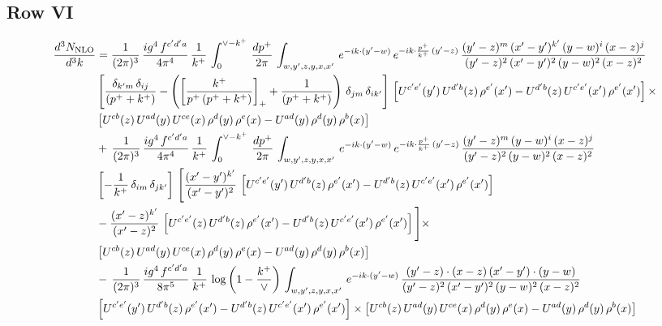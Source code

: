 \documentclass[9pt]{article}
\numberwithin{equation}{section}
\begin{document}
\subsection{Row VI}
\begin{align}
    \frac{d^{3}N_{\rm NLO}}{d^{3}k} & =  \frac{1}{(2\pi)^{3}}\, \frac{ig^{4}\,f^{c'd'a}}{4\pi^{4}}\, \frac{1}{k^{+}}\,\int_{0}^{\vee-k^{+}}\, \frac{dp^{+}}{2\pi}\, \int_{w,y',z,y,x,x'}\, e^{-ik\cdot (y'-w)}\, e^{-ik\cdot \frac{p^{+}}{k^{+}}\,(y'-z)}\,\frac{(y'-z)^{m}\,(x'-y')^{k'}\,(y-w)^{i}\,(x-z)^{j}}{(y'-z)^{2}\,(x'-y')^{2}\,(y-w)^{2}\,(x-z)^{2}}\notag \\ & \left[\frac{\delta_{k'm}\,\delta_{ij}}{(p^{+}+k^{+})}-\left(\left[\frac{k^{+}}{p^{+}\,(p^{+}+k^{+})}\right]_{+}+\frac{1}{(p^{+}+k^{+})}\right)\,\delta_{jm}\,\delta_{ik'}\right]\, \left[U^{c'e'}(y')\,U^{d'b}(z)\,\rho^{e'}(x')-U^{d'b}(z)\,U^{c'e'}(x')\,\rho^{e'}(x')\right]\times\notag \\ &  \left[U^{cb}(z)\,U^{ad}(y)\,U^{ce}(x)\,\rho^{d}(y)\,\rho^{e}(x)-U^{ad}(y)\,\rho^{d}(y)\,\rho^{b}(x)\right] \notag \\ &  +\,\frac{1}{(2\pi)^{3}}\, \frac{ig^{4}\,f^{c'd'a}}{4\pi^{4}}\, \frac{1}{k^{+}}\,\int_{0}^{\vee-k^{+}}\, \frac{dp^{+}}{2\pi}\, \int_{w,y',z,y,x,x'}\, e^{-ik\cdot (y'-w)}\, e^{-ik\cdot \frac{p^{+}}{k^{+}}\,(y'-z)}\,\frac{(y'-z)^{m}\,(y-w)^{i}\,(x-z)^{j}}{(y'-z)^{2}\,(y-w)^{2}\,(x-z)^{2}}\notag \\ &  \left[-\frac{1}{k^{+}}\, \delta_{im}\, \delta_{jk'}\right]\, \Bigg[\frac{(x'-y')^{k'}}{(x'-y')^{2}}\,\left[U^{c'e'}(y')\,U^{d'b}(z)\,\rho^{e'}(x')-U^{d'b}(z)\,U^{c'e'}(x')\,\rho^{e'}(x')\right]\notag \\ & -\frac{(x'-z)^{k'}}{(x'-z)^{2}}\,\left[U^{c'e'}(z)\,U^{d'b}(z)\,\rho^{e'}(x')-U^{d'b}(z)\,U^{c'e'}(x')\,\rho^{e'}(x')\right]\Bigg]\times\notag \\ &    \left[U^{cb}(z)\,U^{ad}(y)\,U^{ce}(x)\,\rho^{d}(y)\,\rho^{e}(x)-U^{ad}(y)\,\rho^{d}(y)\,\rho^{b}(x)\right] \notag \\
&  -\,\frac{1}{(2\pi)^{3}}\, \frac{ig^{4}\,f^{c'd'a}}{8\pi^{5}}\, \frac{1}{k^{+}}\,\log{\left(1-\frac{k^{+}}{\vee}\right)}\, \int_{w,y',z,y,x,x'}\, e^{-ik\cdot (y'-w)}\,\frac{(y'-z)\cdot (x-z)\,(x'-y')\cdot (y-w)}{(y'-z)^{2}\,(x'-y')^{2}\,(y-w)^{2}\,(x-z)^{2}}\notag \\ & \left[U^{c'e'}(y')\,U^{d'b}(z)\,\rho^{e'}(x')-U^{d'b}(z)\,U^{c'e'}(x')\,\rho^{e'}(x')\right]\times  \left[U^{cb}(z)\,U^{ad}(y)\,U^{ce}(x)\,\rho^{d}(y)\,\rho^{e}(x)-U^{ad}(y)\,\rho^{d}(y)\,\rho^{b}(x)\right]
\end{align}
\end{document}
